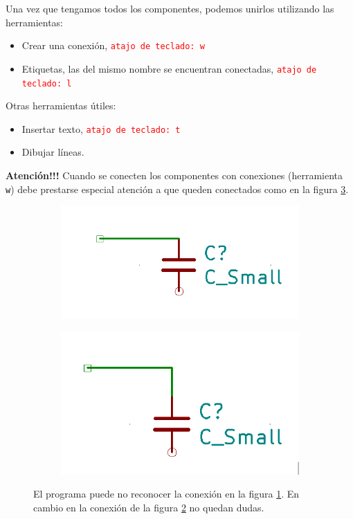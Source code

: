 Una vez que tengamos todos los componentes, podemos unirlos utilizando las herramientas:
\begin{itemize}
	\item Crear una conexión, \textcolor{red}{\texttt{atajo de teclado: w}}
	\item Etiquetas, las del mismo nombre se encuentran conectadas, \textcolor{red}{\texttt{atajo de teclado: l}}
\end{itemize}


Otras herramientas útiles: 
\begin{itemize}
	\item Insertar texto, \textcolor{red}{\texttt{atajo de teclado: t}}
	\item Dibujar líneas. 
\end{itemize}

{\LARGE \textbf{Atención!!!}} Cuando se conecten los componentes con conexiones (herramienta \texttt{w}) debe prestarse especial atención a que queden conectados como en la figura \ref{fig:comparacion_conexiones}.


\begin{figure}[H]
	\centering
	\begin{subfigure}[b]{0.4\textwidth}
		\includegraphics[width=\textwidth]{imagenes/conexion_incorrecta.png}
		\caption{ }
		\label{fig:conexion_incorrecta}
	\end{subfigure}
	\begin{subfigure}[b]{0.4\textwidth}
		\includegraphics[width=\textwidth]{imagenes/conexion_correcta.png}
		\caption{ }
		\label{fig:conexion_correcta}
	\end{subfigure}
	\caption{El programa puede no reconocer la conexión en la figura \ref{fig:conexion_incorrecta}. En cambio en la conexión de la figura \ref{fig:conexion_correcta} no quedan dudas. }
	\label{fig:comparacion_conexiones}
\end{figure}

